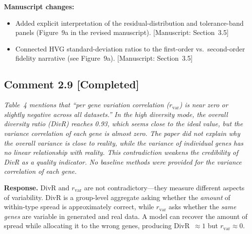 \documentclass[11pt,letterpaper]{article}
\newcommand{\statuscompleted}{\textcolor{statusgreen}{\textbf{[Completed]}}}
\newcommand{\msref}[1]{\textcolor{blue!60!black}{\textsf{[Manuscript: #1]}}}
\begin{document}
\noindent\textbf{Manuscript changes:}
\begin{itemize}
  \item Added explicit interpretation of the residual-distribution and tolerance-band panels (Figure~9a in the revised manuscript). \msref{Section~3.5}
  \item Connected HVG standard-deviation ratios to the first-order vs.\ second-order fidelity narrative (see Figure~9a). \msref{Section~3.5}
\end{itemize}

\medskip

\subsection*{Comment 2.9 \hfill \statuscompleted}

\begin{reviewercomment}
\itshape
Table~4 mentions that ``per gene variation correlation ($r_\text{var}$) is near zero or slightly negative across all datasets.'' In the high diversity mode, the overall diversity ratio (DivR) reaches 0.93, which seems close to the ideal value, but the variance correlation of each gene is almost zero. The paper did not explain why the overall variance is close to reality, while the variance of individual genes has no linear relationship with reality. This contradiction weakens the credibility of DivR as a quality indicator. No baseline methods were provided for the variance correlation of each gene.
\end{reviewercomment}

\noindent\textbf{Response.}
DivR and $r_\text{var}$ are not contradictory---they measure different aspects of variability. DivR is a group-level aggregate asking whether the \emph{amount} of within-type spread is approximately correct, while $r_\text{var}$ asks whether the \emph{same genes} are variable in generated and real data. A model can recover the amount of spread while allocating it to the wrong genes, producing DivR~$\approx 1$ but $r_\text{var} \approx 0$.
\end{document}
